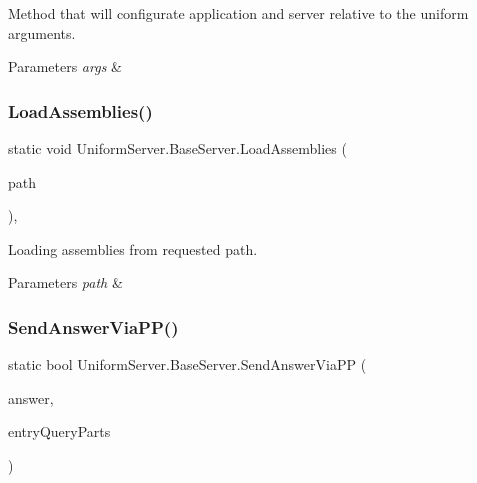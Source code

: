Method that will configurate application and server relative to the uniform arguments. 


\begin{DoxyParams}{Parameters}
{\em args} & \\
\hline
\end{DoxyParams}
\mbox{\label{class_uniform_server_1_1_base_server_a22b92ad517cd1003fe4fe3c86d857169}} 
\subsubsection{\texorpdfstring{Load\+Assemblies()}{LoadAssemblies()}}
{\footnotesize\ttfamily static void Uniform\+Server.\+Base\+Server.\+Load\+Assemblies (\begin{DoxyParamCaption}\item[{string}]{path }\end{DoxyParamCaption})\hspace{0.3cm}{\ttfamily [static]}, {\ttfamily [protected]}}



Loading assemblies from requested path. 


\begin{DoxyParams}{Parameters}
{\em path} & \\
\hline
\end{DoxyParams}
\mbox{\label{class_uniform_server_1_1_base_server_aefbb2a4287a7f995582b2abf41da8a89}} 
\subsubsection{\texorpdfstring{Send\+Answer\+Via\+P\+P()}{SendAnswerViaPP()}}
{\footnotesize\ttfamily static bool Uniform\+Server.\+Base\+Server.\+Send\+Answer\+Via\+PP (\begin{DoxyParamCaption}\item[{string}]{answer,  }\item[{\mbox{\hyperlink{struct_uniform_queries_1_1_query_part}{Uniform\+Queries.\+Query\+Part}} \mbox{[}$\,$\mbox{]}}]{entry\+Query\+Parts }\end{DoxyParamCaption})\hspace{0.3cm}{\ttfamily [static]}}



